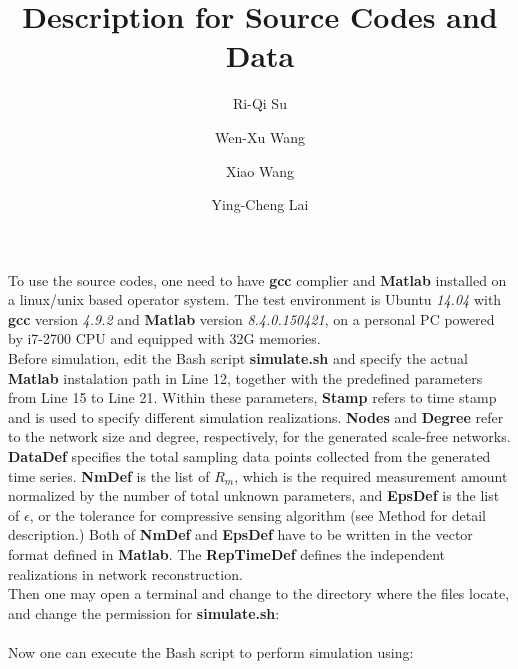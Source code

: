 \documentclass[onecolumn,aps,superscriptaddress,preprint]{revtex4}
\begin{document}
\title{Description for Source Codes and Data}

\author{Ri-Qi Su}

\author{Wen-Xu Wang}

\author{Xiao Wang}

\author{Ying-Cheng Lai} 


\maketitle

To use the source codes, one need to have {\bf gcc} complier and {\bf Matlab}
installed on a linux/unix based operator system. The test environment is Ubuntu
{\it 14.04} with {\bf gcc} version {\it 4.9.2} and {\bf Matlab} version {\it
8.4.0.150421}, on a personal PC powered by i7-2700 CPU and equipped with 32G
memories. \\

\noindent
Before simulation, edit the Bash script {\bf simulate.sh} and specify the actual
{\bf Matlab} instalation path in Line 12, together with the predefined
parameters from Line 15 to Line 21. Within these parameters, {\bf {Stamp}}
refers to time stamp and is used to specify different simulation realizations.
{\bf Nodes} and {\bf Degree} refer to the network size and degree, respectively,
for the generated scale-free networks. {\bf DataDef} specifies the total
sampling data points collected from the generated time series. {\bf NmDef} is
the list of $R_{m}$, which is the required measurement amount normalized by the
number of total unknown parameters, and {\bf EpsDef} is the list of $\epsilon$,
or the tolerance for compressive sensing algorithm (see Method for detail
description.) Both of {\bf NmDef} and {\bf EpsDef} have to be written in the
vector format defined in {\bf Matlab}. The {\bf RepTimeDef} defines the
independent realizations in network reconstruction. \\

\noindent
Then one may open a terminal and change to the directory where the files locate, and change the
permission for {\bf simulate.sh}: \\
 \\
\noindent Now one can execute the Bash script to perform simulation using: \\
 \\
\end{document}
